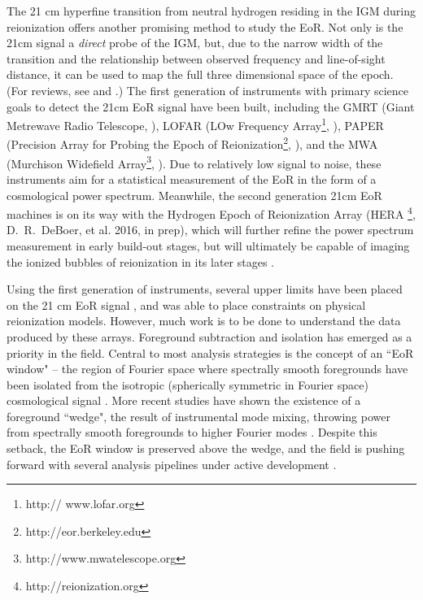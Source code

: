 \documentclass[iop]{emulateapj}
\begin{document}
The 21 cm hyperfine transition from neutral hydrogen residing in the IGM during reionization 
offers another promising method to study the EoR. Not only is the 21cm signal a 
\emph{direct} probe of the IGM, but, due to the narrow width of the transition and the 
relationship between observed frequency and line-of-sight distance, it can be used to map 
the full three dimensional space of the epoch. (For reviews, see \citealt{Furlanetto:2006} 
and \citealt{Morales:2010}.) The first generation of instruments with primary science goals 
to detect the 21cm EoR signal have been built, including the GMRT (Giant Metrewave 
Radio Telescope, \citealt{Paciga:2013}), LOFAR (LOw Frequency Array\footnote{http://
www.lofar.org}, \citealt{Yatawatta:2013}), PAPER (Precision Array for Probing the Epoch of 
Reionization\footnote{http://eor.berkeley.edu}, \citealt{Parsons:2010}), and the MWA 
(Murchison Widefield Array\footnote{http://www.mwatelescope.org}, \citealt{Tingay:2013}). 
Due to relatively low signal to noise, these instruments aim for a statistical measurement of 
the EoR in the form of a cosmological power spectrum. Meanwhile, the second generation 
21cm EoR machines is on its way with the Hydrogen Epoch of Reionization Array (HERA
\footnote{http://reionization.org}, D.~R.~DeBoer, et al. 2016, in prep), which will further 
refine the power spectrum measurement in early build-out stages, but will ultimately be 
capable of imaging the ionized bubbles of reionization in its later stages 
\citep{Beardsley:2015,Malloy:2013}.

Using the first generation of instruments, several upper limits have been placed on the 21 
cm EoR signal \citep{Ali:2015, Dillon:2014, Parsons:2014, Jacobs:2015, Paciga:2013}, and 
\citealt{Pober:2015} was able to place constraints on physical reionization models. 
However, much work is to be done to understand the data produced by these arrays. 
Foreground subtraction and isolation has emerged as a priority in the field. Central to most 
analysis strategies is the concept of an ``EoR window" -- the region of Fourier space where 
spectrally smooth foregrounds have been isolated from the isotropic (spherically symmetric 
in Fourier space) cosmological signal \citep{Morales:2006, Bowman:2009}. More recent 
studies have shown the existence of a foreground ``wedge", the result of instrumental mode 
mixing, throwing power from spectrally smooth foregrounds to higher Fourier modes 
\citep{Thyagarajan:2015b, Thyagarajan:2015, Trott:2012, Liu:2014a, Liu:2014b, 
Hazelton:2013, Pober:2013, Vedantham:2012, Morales:2012, Datta:2010}. Despite this 
setback, the EoR window is preserved above the wedge, and the field is pushing forward with 
several analysis pipelines under active development \citep[e.g. B.~J.~Hazelton et al. 2016, in 
prep; D.~A.~Mitchell et al. 2016, in prep; ][]{Jacobs:2016, Trott:2016, 
Dillon:2013, Trott:2014}.
\end{document}
